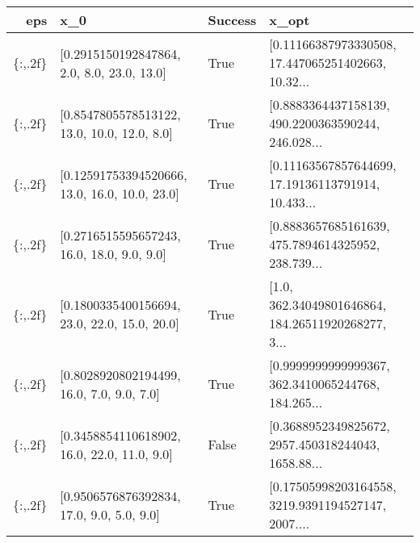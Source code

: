 \begin{tabular}{rlll}
\toprule
    eps &                                           x\_0 &  Success &                                              x\_opt \\
\midrule
\{:,.2f\} &    [0.2915150192847864, 2.0, 8.0, 23.0, 13.0] &     True & [0.11166387973330508, 17.447065251402663, 10.32... \\
\{:,.2f\} &   [0.8547805578513122, 13.0, 10.0, 12.0, 8.0] &     True & [0.8883364437158139, 490.2200363590244, 246.028... \\
\{:,.2f\} & [0.12591753394520666, 13.0, 16.0, 10.0, 23.0] &     True & [0.11163567857644699, 17.19136113791914, 10.433... \\
\{:,.2f\} &    [0.2716515595657243, 16.0, 18.0, 9.0, 9.0] &     True & [0.8883657685161639, 475.7894614325952, 238.739... \\
\{:,.2f\} &  [0.1800335400156694, 23.0, 22.0, 15.0, 20.0] &     True & [1.0, 362.34049801646864, 184.26511920268277, 3... \\
\{:,.2f\} &     [0.8028920802194499, 16.0, 7.0, 9.0, 7.0] &     True & [0.9999999999999367, 362.3410065244768, 184.265... \\
\{:,.2f\} &   [0.3458854110618902, 16.0, 22.0, 11.0, 9.0] &    False & [0.3688952349825672, 2957.450318244043, 1658.88... \\
\{:,.2f\} &     [0.9506576876392834, 17.0, 9.0, 5.0, 9.0] &     True & [0.17505998203164558, 3219.9391194527147, 2007.... \\
\bottomrule
\end{tabular}
